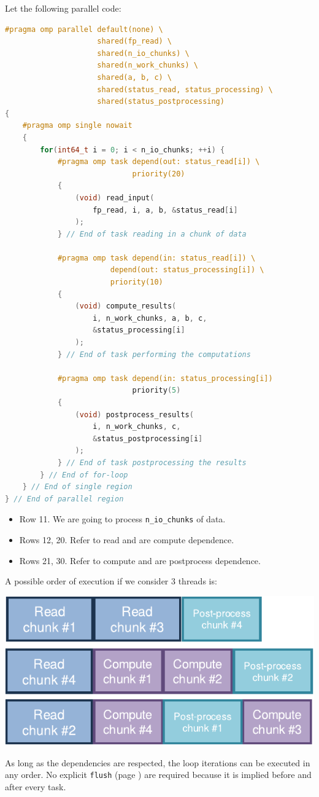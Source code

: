 \begin{examplebox}[: dependences]
    Let the following parallel code:
    \begin{lstlisting}[language=C++, mathescape=true]
#pragma omp parallel default(none) \
                     shared(fp_read) \
                     shared(n_io_chunks) \
                     shared(n_work_chunks) \
                     shared(a, b, c) \
                     shared(status_read, status_processing) \
                     shared(status_postprocessing)
{
    #pragma omp single nowait
    {
        for(int64_t i = 0; i < n_io_chunks; ++i) {
            #pragma omp task depend(out: status_read[i]) \
                             priority(20)
            {
                (void) read_input(
                    fp_read, i, a, b, &status_read[i]
                );
            } // End of task reading in a chunk of data

            #pragma omp task depend(in: status_read[i]) \
                        depend(out: status_processing[i]) \
                        priority(10)
            {
                (void) compute_results(
                    i, n_work_chunks, a, b, c,
                    &status_processing[i]
                );
            } // End of task performing the computations

            #pragma omp task depend(in: status_processing[i])
                             priority(5)
            {
                (void) postprocess_results(
                    i, n_work_chunks, c,
                    &status_postprocessing[i]
                );
            } // End of task postprocessing the results
        } // End of for-loop
    } // End of single region
} // End of parallel region
    \end{lstlisting}
    \begin{itemize}
        \item Row 11. We are going to process \texttt{n\_io\_chunks} of data.
        \item Rows 12, 20. Refer to read and are compute dependence.
        \item Rows 21, 30. Refer to compute and are postprocess dependence.
    \end{itemize}
    \newpage
    A possible order of execution if we consider 3 threads is:
    \begin{center}
        \includegraphics[width=.6\textwidth]{img/task-dependence-1.pdf}
    \end{center}
    As long as the dependencies are respected, the loop iterations can be executed in any order. No explicit \texttt{flush} (page \hyperlink{openmp: flush}{}) are required because it is implied before and after every task.
\end{examplebox}

